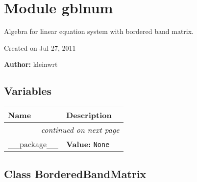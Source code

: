 %
%
%


\section{Module gblnum}

    \label{gblnum}
Algebra for linear equation system with bordered band matrix.

Created on Jul 27, 2011

\textbf{Author:} kleinwrt





  \subsection{Variables}

    \vspace{-1cm}
\hspace{\varindent}\begin{longtable}{|p{\varnamewidth}|p{\vardescrwidth}|l}
\cline{1-2}
\cline{1-2} \centering \textbf{Name} & \centering \textbf{Description}& \\
\cline{1-2}
\endhead\cline{1-2}\multicolumn{3}{r}{\small\textit{continued on next page}}\\\endfoot\cline{1-2}
\endlastfoot\raggedright \_\-\_\-p\-a\-c\-k\-a\-g\-e\-\_\-\_\- & \raggedright \textbf{Value:} 
{\tt None}&\\
\cline{1-2}
\end{longtable}



\subsection{Class BorderedBandMatrix}

